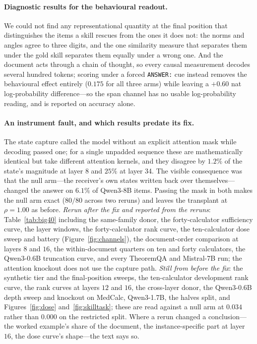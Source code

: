 \documentclass{article}
\begin{document}
\paragraph{Diagnostic results for the behavioural readout.} We could not find any
representational quantity at the final position that distinguishes the items a
skill rescues from the ones it does not: the norms and angles agree to three
digits, and the one similarity measure that separates them under the gold skill
separates them equally under a wrong one. And the document acts through a chain
of thought, so every causal measurement decodes several hundred tokens; scoring
under a forced \texttt{ANSWER:} cue instead removes the behavioural effect
entirely ($0.175$ for all three arms) while leaving a $+0.60$ nat
log-probability difference---so the span channel has no usable log-probability
reading, and is reported on accuracy alone.

\paragraph{An instrument fault, and which results predate its fix.} The state
capture called the model without an explicit attention mask while decoding
passed one; for a single unpadded sequence these are mathematically identical
but take different attention kernels, and they disagree by $1.2\%$ of the
state's magnitude at layer 8 and $25\%$ at layer 34. The visible consequence was
that the null arm---the receiver's own states written back over
themselves---changed the answer on $6.1\%$ of Qwen3-8B items. Passing the mask in
both makes the null arm exact ($80/80$ across two reruns) and leaves the transplant at
$\rho = 1.00$ as before. \emph{Rerun after the fix and reported from the
reruns}: Table~\ref{tab:big40} including the same-family donor, the
forty-calculator sufficiency curve, the layer windows, the forty-calculator rank
curve, the ten-calculator dose sweep and battery (Figure~\ref{fig:channels}),
the document-order comparison at layers $8$ and $16$, the within-document
quarters on ten and forty calculators, the Qwen3-0.6B truncation curve, and
every TheoremQA and Mistral-7B run; the attention knockout does not use the
capture path. \emph{Still from before the fix}: the synthetic tier and the
final-position sweeps, the ten-calculator development rank curve, the rank
curves at layers $12$ and $16$, the cross-layer donor, the Qwen3-0.6B depth
sweep and knockout on MedCalc, Qwen3-1.7B, the halves split, and
Figures~\ref{fig:dose} and~\ref{fig:skilltask}; these are read against a null
arm at $0.034$ rather than $0.000$ on the restricted split. Where a rerun
changed a conclusion---the worked example's share of the document, the
instance-specific part at layer $16$, the dose curve's shape---the text says
so.
\end{document}
